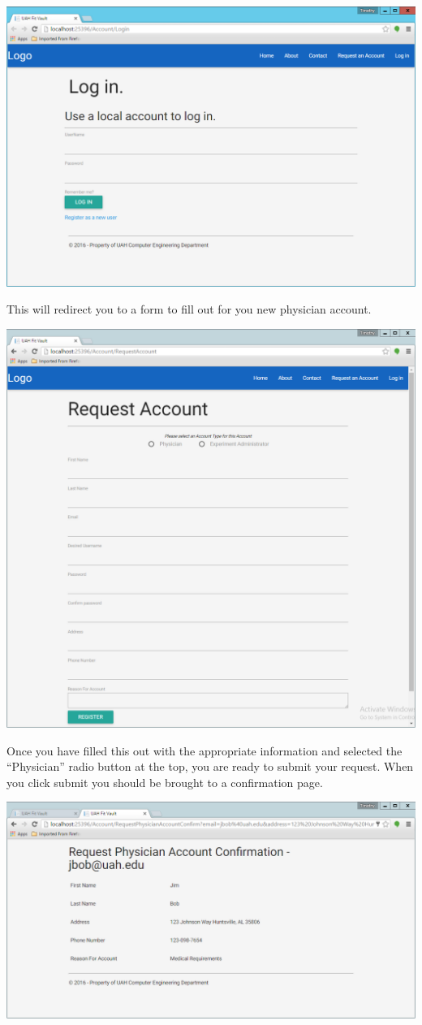 \documentclass[letterpaper,10pt,english]{sphinxmanual}
\begin{document}
\includegraphics{login_screen.png}

This will redirect you to a form to fill out for you new physician account.

\includegraphics{request_account.png}

Once you have filled this out with the appropriate information and selected the ``Physician'' radio button at the top,
you are ready to submit your request. When you click submit you should be brought to a confirmation page.

\includegraphics{request_account_confirmation.png}
\end{document}
